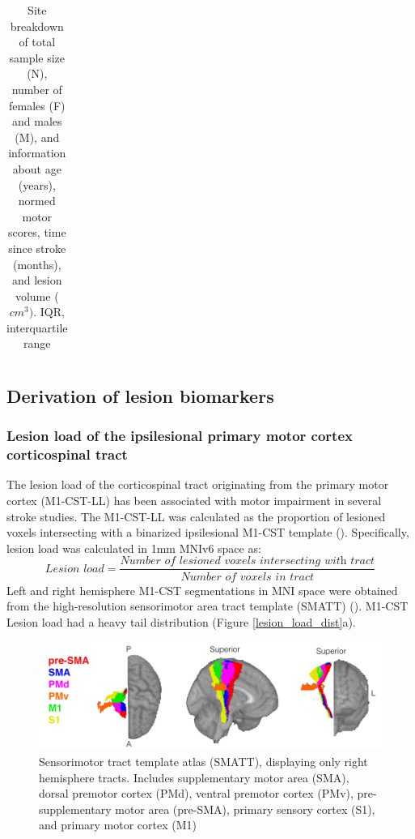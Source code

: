 \documentclass[10pt]{article}
\begin{document}
\begin{table}[h]
\begin{tabular}{llllll}
\bottomrule
\end{tabular}
\caption*{Site breakdown of total sample size (N), number of females (F) and males (M), and information about age (years), normed motor scores, time since stroke (months), and lesion volume ($cm^3)$. IQR, interquartile range}
\end{table}




\subsection{Derivation of lesion biomarkers}
\subsubsection*{Lesion load of the ipsilesional primary motor cortex corticospinal tract}
The lesion load of the corticospinal tract originating from the primary motor cortex (M1-CST-LL) has been associated with motor impairment in several stroke studies. The M1-CST-LL was calculated as the proportion of lesioned voxels intersecting with a binarized ipsilesional M1-CST template (\cite{Zhu2010-qh}). Specifically, lesion load was calculated in 1mm MNIv6 space as:
\begin{equation}
    \textit{Lesion load} = \frac{\textit{Number of lesioned voxels intersecting with  tract}}{\textit{Number of voxels in tract}}
\end{equation}
Left and right hemisphere M1-CST segmentations in MNI space were obtained from the high-resolution sensorimotor area tract template (SMATT) (\cite{Archer2018-ti}). M1-CST Lesion load had a heavy tail distribution (Figure \ref{lesion_load_dist}a).

\begin{figure}[ht]
    \centering
    \includegraphics[width=1\linewidth]{figures/SMATT.png}
    \caption{Sensorimotor tract template atlas (SMATT), displaying only right hemisphere tracts. Includes supplementary motor area (SMA), dorsal premotor cortex (PMd), ventral premotor cortex (PMv), pre-supplementary motor area (pre-SMA), primary sensory cortex (S1),  and primary motor cortex (M1)}
    \label{smatt}
\end{figure}
\end{document}
